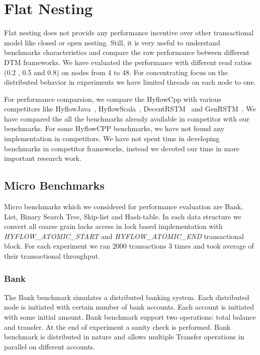 \documentclass[12pt,english]{report}
\begin{document}
\section{Flat Nesting}

Flat nesting does not provide any performance incentive over other transactional model like closed or open nesting. Still, it is very useful to understand benchmarks characteristics and compare the raw performance between different DTM frameworks. We have evaluated the performance with different read ratios (0.2 , 0.5 and 0.8) on nodes from 4 to 48. For concentrating focus on the distributed behavior in experiments we have limited threads on each node to one.  

For performance comparsion, we compare the HyflowCpp with various competitors like HyflowJava~\cite{Saad:2011:HHP:1996130.1996167}, HyflowScala~\cite{turcuhyflow2}, DecentRSTM~\cite{DecentSTM:5470446} and GenRSTM~\cite{GenRSTM:6038614}. We have compared the all the benchmarks already available in competitor with our benchmarks. For some HyflowCPP benchmarks, we have not found any implementation in competitors. We have not spent time in developing benchmarks in competitor frameworks, instead we devoted our time in more important research work. 

\subsection{Micro Benchmarks}

Micro benchmarks which we considered for performance evaluation are Bank, List, Binary Search Tree, Skip-list and Hash-table. In each data structure we convert all coarse grain locks access in lock based implementation with \emph{HYFLOW{\_}ATOMIC{\_}START} and \emph{HYFLOW{\_}ATOMIC{\_}END} transactional block. For each experiment we ran 2000 transactions 3 times and took average of their transactional throughput.  

\subsubsection{Bank}

The Bank benchmark simulates a distributed banking system. Each distributed node is initiated with certain number of bank accounts. Each account is initiated with some initial amount. Bank benchmark support two operations: total balance and transfer. At the end of experiment a sanity check is performed. Bank benchmark is distributed in nature and allows multiple Transfer operations in parallel on different accounts.
\end{document}
